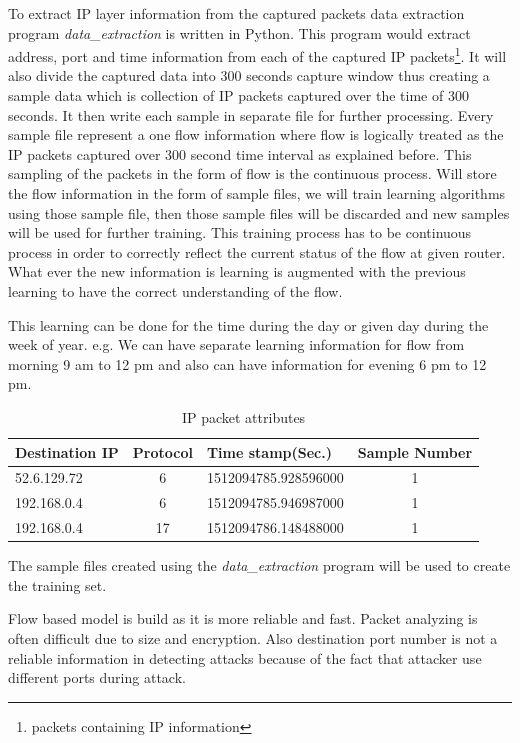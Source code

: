 \documentclass[10pt,oneside,a4paper]{article}
\begin{document}
To extract IP layer information from the captured packets data extraction program \textit{data\_extraction} is written in Python. This program would extract address, port and time information from each of the captured IP packets\footnote{packets containing IP information}. It will also divide the captured data into 300 seconds capture window thus creating a sample data which is collection of IP packets captured over the time of 300 seconds. It then write each sample in separate file for further processing. Every sample file represent a one flow information where flow is logically treated as the IP packets captured over 300 second time interval as explained before. This sampling of the packets in the form of flow is the continuous process. Will store the flow information in the form of sample files, we will train learning algorithms using those sample file, then those sample files will be discarded and new samples will be used for further training. This training process has to be continuous process in order to correctly reflect the current status of the flow at given router. What ever the new information is learning is augmented with the previous learning to have the correct understanding of the flow.

This learning can be done for the time during the day or given day during the week of year. e.g. We can have separate learning information for flow from morning 9 am to 12 pm and also can have information for evening 6 pm to 12 pm.

\begin{table}[h!]
\centering
  \begin{tabular}{| l | c | l | c |}
    \hline
    Destination IP      & Protocol  & Time stamp(Sec.)  & Sample Number \\
    \hline
    52.6.129.72         & 6         & 1512094785.928596000  & 1 \\
    192.168.0.4         & 6         & 1512094785.946987000  & 1 \\
    192.168.0.4         & 17        & 1512094786.148488000  & 1 \\
    \hline
  \end{tabular}
\caption{IP packet attributes} \label{table:attribute}
\end{table}

The sample files created using the \textit{data\_extraction} program will be used to create the training set.

Flow based model is build as it is more reliable and fast. Packet analyzing is often difficult due to size and encryption. Also destination port number is not a reliable information in detecting attacks because of the fact that attacker use different ports during attack.
\end{document}
